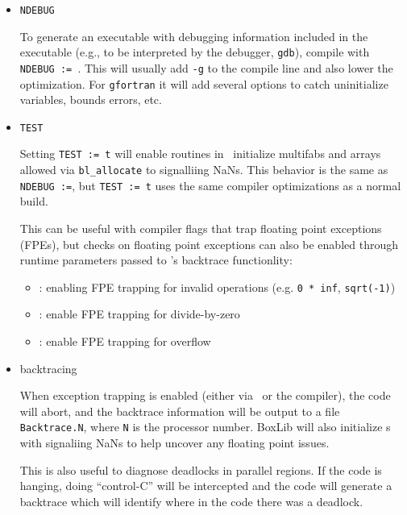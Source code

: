 \begin{itemize}

\item {\tt NDEBUG} 

   To generate an executable
  with debugging information included in the executable (e.g., to be
  interpreted by the debugger, {\tt gdb}), compile with {\tt NDEBUG
    :=\ }.  This will usually add {\tt -g} to the compile line and
  also lower the optimization.  For {\tt gfortran} it will add several
  options to catch uninitialize variables, bounds errors, etc.


\item {\tt TEST}

  Setting {\tt TEST := t} will
  enable routines in \boxlib\ initialize multifabs and arrays 
  allowed via {\tt bl\_allocate} to signalliing NaNs.  This behavior
  is the same as {\tt NDEBUG :=}, but {\tt TEST := t} uses the 
  same compiler optimizations as a normal build.  

  This can be useful with compiler flags that trap floating point
  exceptions (FPEs), but checks on floating point exceptions can also
  be enabled through runtime parameters passed to \boxlib's
  backtrace functionlity:
  \begin{itemize}
  \item {}: enabling FPE trapping for
    invalid operations (e.g. {\tt 0 * inf}, {\tt sqrt(-1)})

  \item {}: enable FPE trapping for
    divide-by-zero

  \item {}: enable FPE trapping for
    overflow
  \end{itemize}

\item backtracing

  When exception trapping is enabled (either via \boxlib\ or the
  compiler), the code will abort, and the backtrace information will
  be output to a file {\tt Backtrace.N}, where {\tt N} is the
  processor number.  BoxLib will also initialize \multifab s with
  signaliing NaNs to help uncover any floating point issues.

  This is also useful to diagnose deadlocks in parallel regions.
  If the code is hanging, doing ``control-C'' will be intercepted
  and the code will generate a backtrace which will identify
  where in the code there was a deadlock.


\end{itemize}
